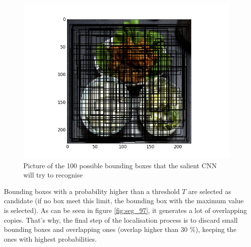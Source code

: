\begin{figure}
    \centering
    \includegraphics[scale=0.5]{img/seg_100_bboxes.jpg}
    \caption{Picture of the 100 possible bounding boxes that the salient CNN will try to recognise}
    \label{fig:seg_100_bboxes}
\end{figure}

Bounding boxes with a probability higher than a threshold $T$ are selected as candidate (if no box meet this limit, the bounding box with the maximum value is selected). As can be seen in figure \ref{fig:seg_97}, it generates a lot of overlapping copies. That's why, the final step of the localisation process is to discard small bounding boxes and overlapping ones (overlap higher than 30 \%), keeping the ones with highest probabilities.

